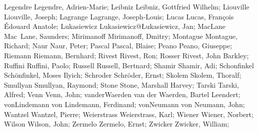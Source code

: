 \DefFriend Legendre         Legendre, Adrien-Marie;
\DefFriend Leibniz          Leibniz, Gottfried Wilhelm;
\DefFriend Liouville        Liouville, Joseph;
\DefFriend Lagrange         Lagrange, Joseph-Louis;
\DefFriend Lucas            Lucas, François Édouard Anatole;
\DefFriend Lukasiewicz      Lukasiewicz@Łukasiewicz, Jan;
\DefFriend MacLane          Mac~Lane, Saunders;
\DefFriend Mirimanoff       Mirimanoff, Dmitry;
\DefFriend Montague         Montague, Richard;
\DefFriend Naur             Naur, Peter;
\DefFriend Pascal           Pascal, Blaise;
\DefFriend Peano            Peano, Giuseppe;
\DefFriend Riemann          Riemann, Bernhard;
\DefFriend Rivest           Rivest, Ron;
\DefFriend Rosser           Rivest, John Barkley;
\DefFriend Ruffini          Ruffini, Paolo;
\DefFriend Russell          Russell, Bertnard;
\DefFriend Shamir           Shamir, Adi;
\DefFriend Schonfinkel      Schönfinkel, Moses Ilyich;
\DefFriend Schroder         Schröder, Ernst;
\DefFriend Skolem           Skolem, Thoralf;
\DefFriend Smullyan         Smullyan, Raymond;
\DefFriend Stone            Stone, Marshall Harvey;
\DefFriend Tarski           Tarski, Alfred;
\DefFriend Venn             Venn, John;
\DefFriend vanderWaerden    van der Waerden, Bartel Leendert;
\DefFriend vonLindemann     von Lindemann, Ferdinand;
\DefFriend vonNeumann       von Neumann, John;
\DefFriend Wantzel          Wantzel, Pierre;
\DefFriend Weierstrass      Weierstrass, Karl;
\DefFriend Wiener           Wiener, Norbert;
\DefFriend Wilson           Wilson, John;
\DefFriend Zermelo          Zermelo, Ernst;
\DefFriend Zwicker          Zwicker, William;
